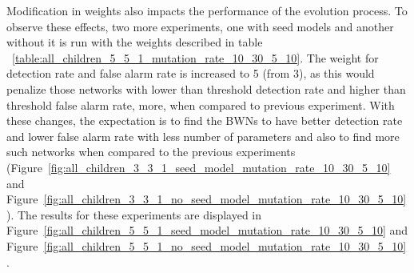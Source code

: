 Modification in weights also impacts the performance of the evolution process. To observe these effects, two more experiments, one with seed models and another without it is run with the weights described in table ~\ref{table:all_children_5_5_1_mutation_rate_10_30_5_10}. The weight for detection rate and false alarm rate is increased to 5 (from 3), as this would penalize those networks with lower than threshold detection rate and higher than threshold false alarm rate, more, when compared to previous experiment. With these changes, the expectation is to find the BWNs to have better detection rate and lower false alarm rate with less number of parameters and also to find more such networks when compared to the previous experiments  (Figure~\ref{fig:all_children_3_3_1_seed_model_mutation_rate_10_30_5_10} and Figure~\ref{fig:all_children_3_3_1_no_seed_model_mutation_rate_10_30_5_10}). The results for these experiments are displayed in Figure~\ref{fig:all_children_5_5_1_seed_model_mutation_rate_10_30_5_10} and Figure~\ref{fig:all_children_5_5_1_no_seed_model_mutation_rate_10_30_5_10}.

\begingroup
\setlength{\tabcolsep}{5pt}
\renewcommand{\arraystretch}{1.2}
\begin{table}[h!]
\normalsize
{}
\caption{Mutation rate and weights for metrics}
\label{table:all_children_5_5_1_mutation_rate_10_30_5_10}
\end{table}
\endgroup

